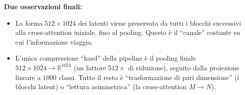 \documentclass[
  11pt,
]{article}
\begin{document}
\begin{notabox}[title={\textbf{Checkpoint dimensioni finale --- fine \S1.4 (Forward Pass completo)}}]
\medskip
\textbf{Due osservazioni finali:}
\begin{itemize}\setlength\itemsep{0.2em}
\item La forma $512 \times 1024$ dei latenti viene preservata da tutti i blocchi successivi alla cross-attention iniziale, fino al pooling. Questo è il ``canale'' costante su cui l'informazione viaggia.
\item L'unica compressione ``hard'' della pipeline è il pooling finale $512 \times 1024 \to \mathbb{R}^{1024}$ (un fattore $512\times$ di riduzione), seguito dalla proiezione lineare a $1000$ classi. Tutto il resto è ``trasformazione di pari dimensione'' (i blocchi latent) o ``lettura asimmetrica'' (la cross-attention $M \to N$).
\end{itemize}
\end{notabox}
\end{document}
